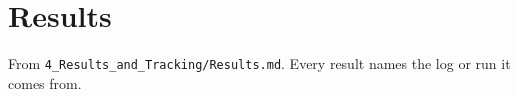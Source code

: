 \section{Results}
\label{sec:results}

From \texttt{4\_Results\_and\_Tracking/Results.md}. Every result names the log or run it comes
from.
